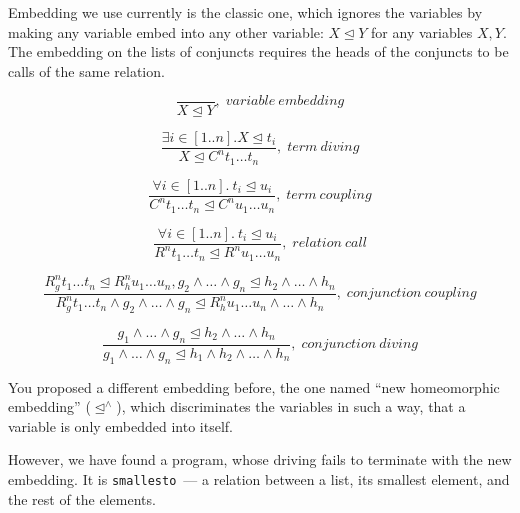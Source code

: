 \documentclass{llncs}
\newcommand{\crule}[3]{\frac{#1}{#2},\;{#3}}
\begin{document}
Embedding we use currently is the classic one, which ignores the variables by making any variable embed into any other variable: $X \trianglelefteq Y$ for any variables $X, Y$. The embedding on the lists of conjuncts requires the heads of the conjuncts to be calls of the same relation. 

$$
\crule{}
      {X \trianglelefteq Y}
      {variable \ embedding}
$$

$$
\crule{\exists i \in [1..n]. X \trianglelefteq t_i}
      {X \trianglelefteq C^n t_1 \dots t_n}
      {term \ diving}
$$

$$
\crule{\forall i \in [1..n]. \ t_i \trianglelefteq u_i}
      {C^n t_1 \dots t_n \trianglelefteq C^n u_1 \dots u_n}
      {term \ coupling}
$$

$$
\crule{\forall i \in [1..n]. \ t_i \trianglelefteq u_i}
      {R^n t_1 \dots t_n \trianglelefteq R^n u_1 \dots u_n}
      {relation \ call}
$$

$$
\crule{R_g^n t_1 \dots t_n \trianglelefteq R_h^n u_1 \dots u_n, g_2 \wedge \dots \wedge g_n \trianglelefteq h_2 \wedge \dots \wedge h_n}
      {R_g^n t_1 \dots t_n \wedge g_2 \wedge \dots \wedge g_n \trianglelefteq R_h^n u_1 \dots u_n \wedge \dots \wedge h_n}
      {conjunction \ coupling}
$$

$$
\crule{g_1 \wedge \dots \wedge g_n \trianglelefteq h_2 \wedge \dots \wedge h_n}
      {g_1 \wedge \dots \wedge g_n \trianglelefteq h_1 \wedge h_2 \wedge \dots \wedge h_n}
      {conjunction \ diving}
$$

      You proposed a different embedding before, the one named ``new homeomorphic embedding'' ($\trianglelefteq^\wedge$), which discriminates the variables in such a way, that a variable is only embedded into itself.

\begin{comment}

$$
\crule{}
      {X \trianglelefteq X}
      {variable \ embedding}
$$

     
      The top-level embedding checks, that there is a substitution, which makes the goal to be embedded into the other goal by the classic homeomorphic embedding: 

$$
\crule{\exists \sigma. A \sigma \trianglelefteq B}
      {A {\trianglelefteq}^{subst} B}
      {toplevel}
$$
\end{comment}
      
However, we have found a program, whose driving fails to terminate with the new embedding. It is \verb!smallesto!~--- a relation between a list, its smallest element, and the rest of the elements. 
\end{document}
